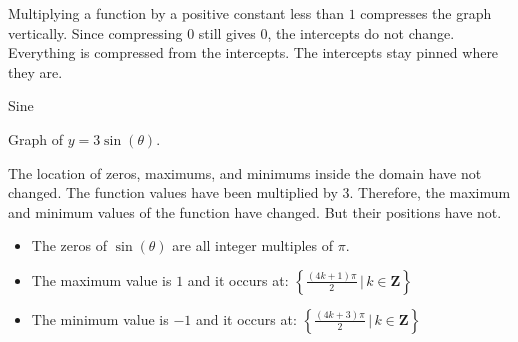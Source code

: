 \documentclass{ximera}
\begin{document}
Multiplying a function by a positive constant less than $1$ compresses the graph vertically.  Since compressing $0$ still gives $0$, the intercepts do not change.  Everything is compressed from the intercepts. The intercepts stay pinned where they are.
























\begin{example} Sine



Graph of $y = 3 \sin(\theta)$.

\begin{image}
\end{image}


The location of zeros, maximums, and minimums inside the domain have not changed.  The function values have been multiplied by $3$. Therefore, the maximum and minimum values of the function have changed. But their positions have not.

\begin{itemize}
\item The zeros of $\sin(\theta)$ are all integer multiples of $\pi$.
\item The maximum value is $1$ and it occurs at:  $\left\{     \frac{(4k+1)\pi}{2} \, | \, k \in \textbf{Z}     \right\}$
\item The minimum value is $-1$ and it occurs at:  $\left\{    \frac{(4k+3)\pi}{2} \, | \, k \in \textbf{Z}     \right\}$
\end{itemize}













\end{example}
\end{document}

